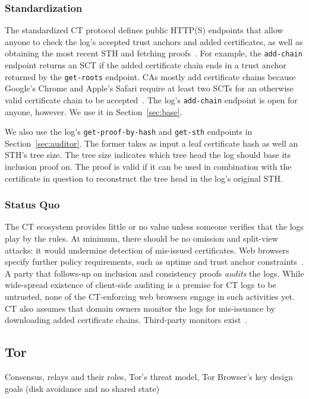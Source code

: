\subsubsection{Standardization}
The standardized CT protocol defines public HTTP(S) endpoints that allow anyone
to check the log's accepted trust anchors and added certificates, as well as
obtaining the most recent STH and fetching proofs~\cite{ct,ct/bis}.  For
example, the \texttt{add-chain} endpoint returns an SCT if the added
certificate chain ends in a trust anchor returned by the \texttt{get-roots}
endpoint.  CAs mostly add certificate chains because Google's Chrome and
Apple's Safari require at least two SCTs for an otherwise valid certificate
chain to be accepted~\cite{chrome-policy,safari-policy}.  The log's
\texttt{add-chain} endpoint is open for anyone, however.  We use it in
Section~\ref{sec:base}.

We also use the log's \texttt{get-proof-by-hash} and \texttt{get-sth} endpoints
in Section~\ref{sec:auditor}.  The former takes as input a leaf certificate hash
as well an STH's tree size.  The tree size indicates which tree head the log
should base its inclusion proof on.  The proof is valid if it can be used in
combination with the certificate in question to reconstruct the tree head in the
log's original STH.

\subsubsection{Status Quo}
The CT ecosystem provides little or no value unless someone verifies that the
logs play by the rules.  At minimum, there should be no omission and split-view
attacks:
	it would undermine detection of mis-issued certificates.
Web browsers specify further policy requirements, such as uptime and trust
anchor constraints~\cite{chrome-policy,safari-policy}.  A party that follows-up
on inclusion and consistency proofs \emph{audits} the logs.  While 
wide-spread existence of client-side auditing is a premise for CT logs to be
untrusted, none of the CT-enforcing web browsers engage in such activities yet.
CT also assumes that domain owners monitor the logs for mis-issuance by
downloading added certificate chains.  Third-party monitors
exist~\cite{ct-monitors}.

\subsection{Tor} \label{sec:background:tor}
Consensus, relays and their roles, Tor's threat model, Tor Browser's key
design goals (disk avoidance and no shared state)
